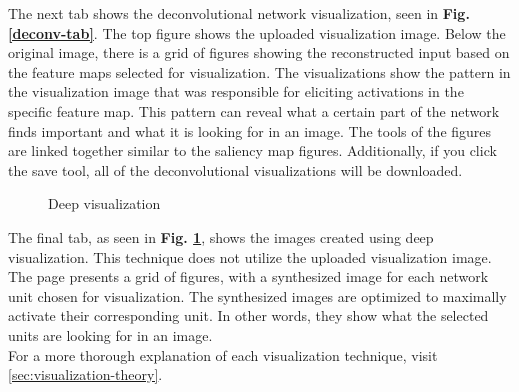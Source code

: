 \noindent The next tab shows the deconvolutional network visualization, seen in \textbf{Fig. \ref{deconv-tab}}. The top figure shows the uploaded visualization image. Below the original image, there is a grid of figures showing the reconstructed input based on the feature maps selected for visualization. The visualizations show the pattern in the visualization image that was responsible for eliciting activations in the specific feature map. This pattern can reveal what a certain part of the network finds important and what it is looking for in an image. The tools of the figures are linked together similar to the saliency map figures. Additionally, if you click the save tool, all of the deconvolutional visualizations will be downloaded.\\

\begin{figure}[!h]
    \centering
        \caption{Deep visualization}
        \label{deepvis-tab}
\end{figure}

\noindent The final tab, as seen in \textbf{Fig. \ref{deepvis-tab}}, shows the images created using deep visualization. This technique does not utilize the uploaded visualization image. The page presents a grid of figures, with a synthesized image for each network unit chosen for visualization. The synthesized images are optimized to maximally activate their corresponding unit. In other words, they show what the selected units are looking for in an image. \\

\noindent For a more thorough explanation of each visualization technique, visit \autoref{sec:visualization-theory}.

\cleardoublepage